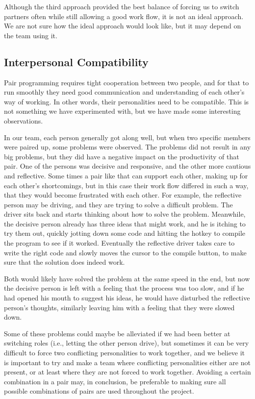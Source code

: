 Although the third approach provided the best balance of forcing us to switch partners often while still allowing a good work flow, it is not an ideal approach.
We are not sure how the ideal approach would look like, but it may depend on the team using it.

\subsection{Interpersonal Compatibility}
Pair programming requires tight cooperation between two people, and for that to run smoothly they need good communication and understanding of each other's way of working.
In other words, their personalities need to be compatible.
This is not something we have experimented with, but we have made some interesting observations. 

In our team, each person generally got along well, but when two specific members were paired up, some problems were observed.
The problems did not result in any big problems, but they did have a negative impact on the productivity of that pair.
One of the persons was decisive and responsive, and the other more cautious and reflective.
Some times a pair like that can support each other, making up for each other's shortcomings, but in this case their work flow differed in such a way, that they would become frustrated with each other.
For example, the reflective person may be driving, and they are trying to solve a difficult problem. The driver sits back and starts thinking about how to solve the problem.
Meanwhile, the decisive person already has three ideas that might work, and he is itching to try them out, quickly jotting down some code and hitting the hotkey to compile the program to see if it worked.
Eventually the reflective driver takes care to write the right code and slowly moves the cursor to the compile button, to make sure that the solution does indeed work.

Both would likely have solved the problem at the same speed in the end, but now the decisive person is left with a feeling that the process was too slow, and if he had opened his mouth to suggest his ideas, he would have disturbed the reflective person's thoughts, similarly leaving him with a feeling that they were slowed down.

Some of these problems could maybe be alleviated if we had been better at switching roles (i.e., letting the other person drive), but sometimes it can be very difficult to force two conflicting personalities to work together, and we believe it is important to try and make a team where conflicting personalities either are not present, or at least where they are not forced to work together.
Avoiding a certain combination in a pair may, in conclusion, be preferable to making sure all possible combinations of pairs are used throughout the project.

